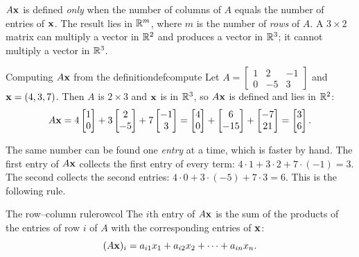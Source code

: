 \documentclass[11pt]{article}
\begin{document}
\begin{warn}
$A\mathbf{x}$ is defined \emph{only} when the number of columns of $A$ equals the number of entries of $\mathbf{x}$. The result lies in $\mathbb{R}^m$,
where $m$ is the number of \emph{rows} of $A$. A $3\times2$ matrix can multiply a vector in $\mathbb{R}^2$ and produces a vector in $\mathbb{R}^3$;
it cannot multiply a vector in $\mathbb{R}^3$.
\end{warn}
 
\begin{exmp}{Computing $A\mathbf{x}$ from the definition}{defcompute}
Let $A=\begin{bmatrix}1&2&-1\\0&-5&3\end{bmatrix}$ and $\mathbf{x}=(4,3,7)$. Then $A$ is $2\times3$ and $\mathbf{x}$ is in $\mathbb{R}^3$, so
$A\mathbf{x}$ is defined and lies in $\mathbb{R}^2$:
\[
A\mathbf{x}=4\begin{bmatrix}1\\0\end{bmatrix}+3\begin{bmatrix}2\\-5\end{bmatrix}+7\begin{bmatrix}-1\\3\end{bmatrix}
=\begin{bmatrix}4\\0\end{bmatrix}+\begin{bmatrix}6\\-15\end{bmatrix}+\begin{bmatrix}-7\\21\end{bmatrix}
=\begin{bmatrix}3\\6\end{bmatrix}.
\]
\end{exmp}
 
The same number can be found one \emph{entry} at a time, which is faster by hand. The first entry of $A\mathbf{x}$ collects
the first entry of every term: $4\cdot1+3\cdot2+7\cdot(-1)=3$. The second collects the second entries:
$4\cdot0+3\cdot(-5)+7\cdot3=6$. This is the following rule.
 
\begin{thm}{The row--column rule}{rowcol}
The $i$th entry of $A\mathbf{x}$ is the sum of the products of the entries of row $i$ of $A$ with the corresponding entries of $\mathbf{x}$:
\[
(A\mathbf{x})_i=a_{i1}x_1+a_{i2}x_2+\cdots+a_{in}x_n.
\]
\end{thm}
 
\end{document}
